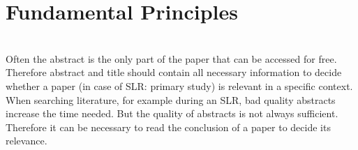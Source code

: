 
\section {Fundamental Principles}
\label{sec:fundamental principles}
\\
Often the abstract is the only part of the paper that can be accessed for free. Therefore abstract and title should contain all necessary information to decide whether a paper (in case of SLR: primary study) is relevant in a specific context. When searching literature, for example during an SLR, bad quality abstracts increase the time needed. But the quality of abstracts is not always sufficient. Therefore it can be necessary to read the conclusion of a paper to decide its relevance. \cite{Brereton2007}\\
